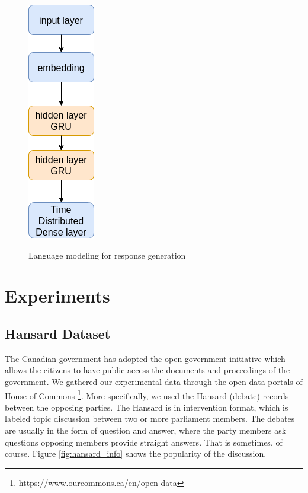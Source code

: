 \begin{figure}[!ht]
	\centering
  	\caption{Language modeling for response generation}
	\includegraphics[scale=0.5]{img/GRU_generative}
  	\label{fig:gru_generative_model}
\end{figure}

\vspace{-0.65em}

\section{Experiments}
\subsection{Hansard Dataset}
The Canadian government has adopted the open government initiative which allows the citizens to have public access the documents and proceedings of the government. We gathered our experimental data through the open-data portals of House of Commons \footnote{https://www.ourcommons.ca/en/open-data}. More specifically, we used the Hansard (debate) records between the opposing parties. The Hansard is in intervention format, which is labeled topic discussion between two or more parliament members. The debates are usually in the form of question and answer, where the party members ask questions opposing members provide straight answers. That is sometimes, of course. Figure \ref{fig:hansard_info} shows the popularity of the discussion.

